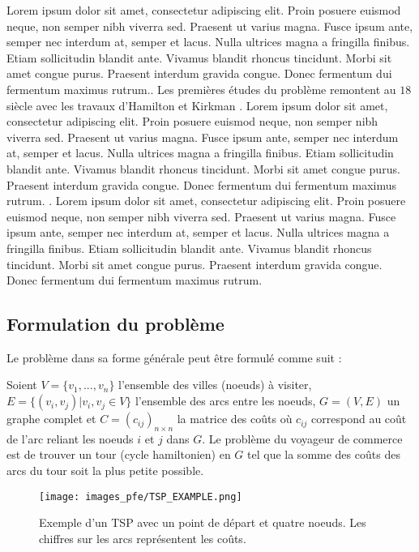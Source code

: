 Lorem ipsum dolor sit amet, consectetur adipiscing elit. Proin posuere euismod neque, non semper nibh viverra sed. Praesent ut varius magna. Fusce ipsum ante, semper nec interdum at, semper et lacus. Nulla ultrices magna a fringilla finibus. Etiam sollicitudin blandit ante. Vivamus blandit rhoncus tincidunt. Morbi sit amet congue purus. Praesent interdum gravida congue. Donec fermentum dui fermentum maximus rutrum.. Les premières études du problème remontent au $18$ siècle  avec les travaux d'Hamilton et Kirkman \parencite{davendra_traveling_2010}. Lorem ipsum dolor sit amet, consectetur adipiscing elit. Proin posuere euismod neque, non semper nibh viverra sed. Praesent ut varius magna. Fusce ipsum ante, semper nec interdum at, semper et lacus. Nulla ultrices magna a fringilla finibus. Etiam sollicitudin blandit ante. Vivamus blandit rhoncus tincidunt. Morbi sit amet congue purus. Praesent interdum gravida congue. Donec fermentum dui fermentum maximus rutrum. \parencite{gutin_traveling_2006}. Lorem ipsum dolor sit amet, consectetur adipiscing elit. Proin posuere euismod neque, non semper nibh viverra sed. Praesent ut varius magna. Fusce ipsum ante, semper nec interdum at, semper et lacus. Nulla ultrices magna a fringilla finibus. Etiam sollicitudin blandit ante. Vivamus blandit rhoncus tincidunt. Morbi sit amet congue purus. Praesent interdum gravida congue. Donec fermentum dui fermentum maximus rutrum.

\subsection{Formulation du problème}
Le problème dans sa forme générale peut être formulé comme suit :

\medskip
Soient $ V = \{v_1,...,v_n\} $ l'ensemble des villes (noeuds) à visiter, $ E = \{ (v_i,v_j) | v_i,v_j \in V \}$ l'ensemble des arcs entre les noeuds, $G = (V,E)$ un graphe complet et $C = (c_{ij})_{n × n}$ la matrice des coûts où $c_{ij}$ correspond au coût de l'arc reliant les noeuds $i$ et $j$ dans $G$. Le problème du voyageur de commerce est de trouver un tour (cycle hamiltonien) en $G$ tel que la somme des coûts des arcs du tour soit la plus petite possible.

\medskip

\begin{figure}[hbt!]
  \centering
  \texttt{[image: images\_pfe/TSP\_EXAMPLE.png]}
  \caption{Exemple d'un TSP avec un point de départ et quatre noeuds. Les chiffres sur les arcs représentent les coûts.}
  \label{fig:tsp-example}
\end{figure}
\FloatBarrier

